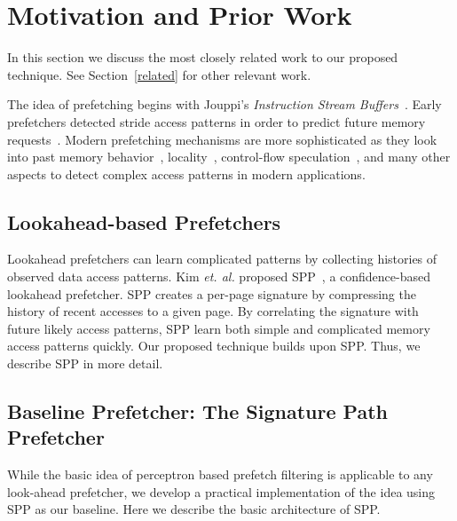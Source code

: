 \section{Motivation and Prior Work}
\label{Background}

In this section we discuss the most closely related work to our
proposed technique. See Section~\ref{related} for other relevant work.

The idea of prefetching begins with Jouppi's \textit{Instruction
  Stream Buffers}~\cite{ISB}.  Early prefetchers detected stride access
patterns in order to predict future memory
requests~\cite{Smith,Baer,Stride}. Modern prefetching mechanisms are
more sophisticated as they look into past memory
behavior~\cite{Address_Correlated,AMPM},
locality~\cite{Spatial_Pattern,SMS,Temporal_Instruction_Fetch,Off_Chip,STMS,SMS_JILP},
control-flow speculation~\cite{BFetch,MTBFetch}, and many other
aspects to detect complex access patterns in modern applications.

\subsection{Lookahead-based Prefetchers}

Lookahead prefetchers can learn complicated patterns by collecting
histories of observed data access patterns.
Kim {\em et. al.} proposed SPP~\cite{SPP}, a confidence-based
lookahead prefetcher.  SPP creates a per-page signature by compressing
the history of recent accesses to a given page.  By correlating the
signature with future likely access patterns, SPP learn both simple
and complicated memory access patterns quickly.  Our proposed
technique builds upon SPP. Thus, we describe SPP in more detail.

\subsection{Baseline Prefetcher: The Signature Path Prefetcher}
\label{Background-SPP}

While the basic idea of perceptron based prefetch filtering is applicable to
any look-ahead prefetcher, we develop a practical implementation of the idea
using SPP as our baseline. Here we describe the basic architecture of SPP.\\

